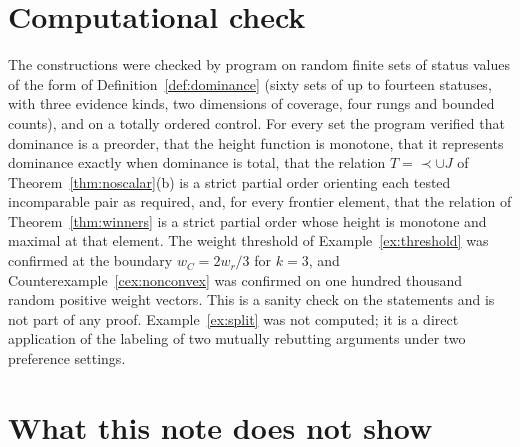 \documentclass[11pt]{article}
\theoremstyle{plain}
\theoremstyle{definition}
\theoremstyle{remark}
\begin{document}
\section{Computational check}\label{sec:check}

The constructions were checked by program on random finite sets of status values of the form of Definition~\ref{def:dominance} (sixty sets of up to fourteen statuses, with three evidence kinds, two dimensions of coverage, four rungs and bounded counts), and on a totally ordered control. For every set the program verified that dominance is a preorder, that the height function is monotone, that it represents dominance exactly when dominance is total, that the relation $T={\prec}\cup J$ of Theorem~\ref{thm:noscalar}(b) is a strict partial order orienting each tested incomparable pair as required, and, for every frontier element, that the relation of Theorem~\ref{thm:winners} is a strict partial order whose height is monotone and maximal at that element. The weight threshold of Example~\ref{ex:threshold} was confirmed at the boundary $w_C=2w_r/3$ for $k=3$, and Counterexample~\ref{cex:nonconvex} was confirmed on one hundred thousand random positive weight vectors. This is a sanity check on the statements and is not part of any proof. Example~\ref{ex:split} was not computed; it is a direct application of the labeling of two mutually rebutting arguments under two preference settings.

\section{What this note does not show}\label{sec:claims}
\end{document}
